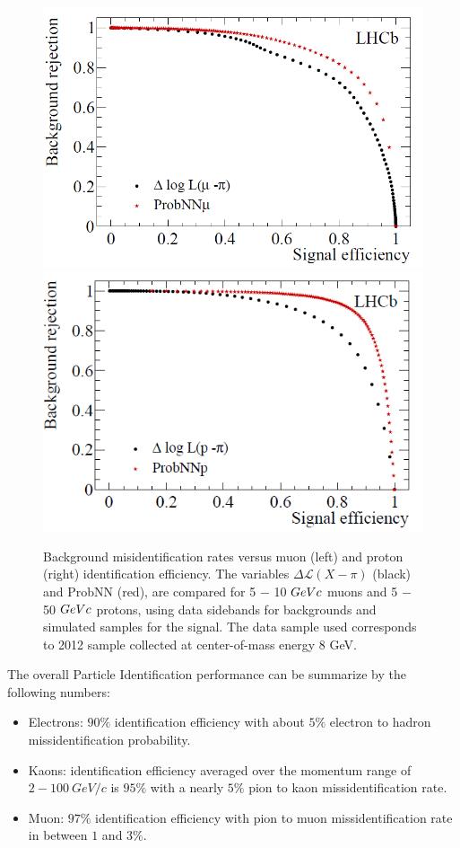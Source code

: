 \begin{figure}[h]
 \begin{center}
  \includegraphics[width=0.49\linewidth]{figures/PID_prob_left.PNG}
   \includegraphics[width=0.49\linewidth]{figures/PID_prob_right.PNG}
    \caption{Background misidentification rates versus muon (left) and proton (right)
identification efficiency. The variables $\Delta \mathcal{L} (X −\pi)$
(black) and ProbNN (red), are compared for 5 − 10 $GeV\/c$ muons and 5 − 50 $GeV\/c$ protons,
using data sidebands for backgrounds and simulated samples for the signal. The data sample
used corresponds to 2012 sample collected at center-of-mass energy 8 GeV.}%
\label{fig:PID baseline}%
 \end{center}
\end{figure}

The overall Particle Identification performance can be summarize by the following numbers:

\begin{itemize}
    \item Electrons: $90\%$ identification efficiency with about $5\%$ electron to hadron missidentification probability. 
    \item Kaons: identification efficiency averaged over the momentum range of\\ $2-100~ GeV/c$ is $95\%$ with a nearly $5\%$ pion to kaon missidentification rate. 
    \item Muon: $97\%$ identification efficiency with pion to muon missidentification rate in between $1$ and $3\%$.  
\end{itemize}


